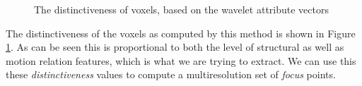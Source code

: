 \begin{figure}
	\centering
	  \hspace{.15in}
	\caption{The distinctiveness of voxels, based on the wavelet attribute vectors}
	\label{fig:distinctiveness}
\end{figure}

The distinctiveness of the voxels as computed by this method is shown in Figure \ref{fig:distinctiveness}. As can be seen this is proportional to both the level of structural as well as motion relation features, which is what we are trying to extract. We can use this these {\em distinctiveness} values to compute a multiresolution set of {\em focus} points. 


